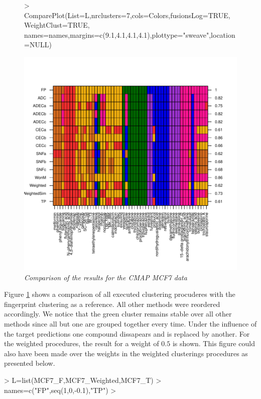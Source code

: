\documentclass[a4paper]{article}
\begin{document}
\newpage
\begin{figure}[!h] 
\centering
\begin{Schunk}
\begin{Sinput}
> ComparePlot(List=L,nrclusters=7,cols=Colors,fusionsLog=TRUE,WeightClust=TRUE,
             names=names,margins=c(9.1,4.1,4.1,4.1),plottype="sweave",location=NULL)
\end{Sinput}
\end{Schunk}
\includegraphics{IntClustVignette-ComparePlot1}
\caption{{\it Comparison of the results for the CMAP MCF7 data}\label{MCF7_All}}
\end{figure}
\noindent Figure \ref{MCF7_All} shows a comparison of all executed clustering
procuderes with the fingerprint clustering as a reference. All other methods were reordered
accordingly. We notice that the green cluster remains stable over all other
methods since all  but one are grouped together every time. Under the influence
of the target predictions one compound dissapears and is replaced by another.
For the weighted procedures, the result for a weight of $0.5$ is shown. This
figure could also have been made over the weights in the weighted clusterings
procedures as presented below.
\begin{Schunk}
\begin{Sinput}
> L=list(MCF7_F,MCF7_Weighted,MCF7_T)
> names=c("FP",seq(1,0,-0.1),"TP")
> 
\end{Sinput}
\end{Schunk}
\end{document}
